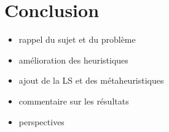 \chapter*{Conclusion}

\begin{itemize}
	\item rappel du sujet et du problème
	\item amélioration des heuristiques
	\item ajout de la LS et des métaheuristiques
	\item commentaire sur les résultats
	\item perspectives
\end{itemize}
